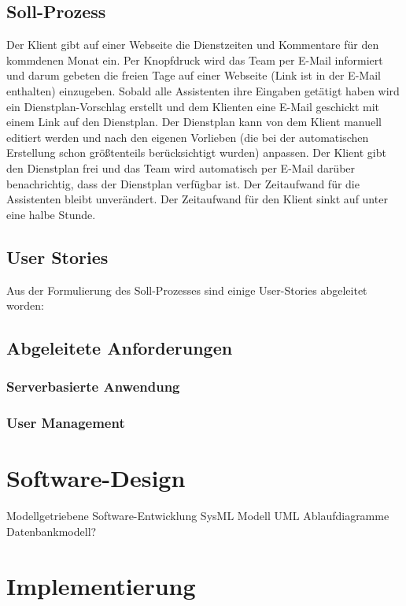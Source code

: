 \documentclass[12pt,a4paper,titlepage]{article} %
\begin{document}
\subsection{Soll-Prozess}
Der Klient gibt auf einer Webseite die Dienstzeiten und Kommentare für den kommdenen Monat ein. Per Knopfdruck wird das Team per E-Mail informiert und darum gebeten die freien Tage auf einer Webseite (Link ist in der E-Mail enthalten) einzugeben. Sobald alle Assistenten ihre Eingaben getätigt haben wird ein Dienstplan-Vorschlag erstellt und dem Klienten eine E-Mail geschickt mit einem Link auf den Dienstplan. Der Dienstplan kann von dem Klient manuell editiert werden und nach den eigenen Vorlieben (die bei der automatischen Erstellung schon größtenteils berücksichtigt wurden) anpassen. Der Klient gibt den Dienstplan frei und das Team wird automatisch per E-Mail darüber benachrichtig, dass der Dienstplan verfügbar ist.
Der Zeitaufwand für die Assistenten bleibt unverändert. Der Zeitaufwand für den Klient sinkt auf unter eine halbe Stunde.

\subsection{User Stories}
Aus der Formulierung des Soll-Prozesses sind einige User-Stories abgeleitet worden:


\subsection{Abgeleitete Anforderungen}
\subsubsection{Serverbasierte Anwendung}
\subsubsection{User Management}


\section{Software-Design} %
Modellgetriebene Software-Entwicklung
SysML Modell
UML Ablaufdiagramme
Datenbankmodell?

\section{Implementierung}
\end{document}
